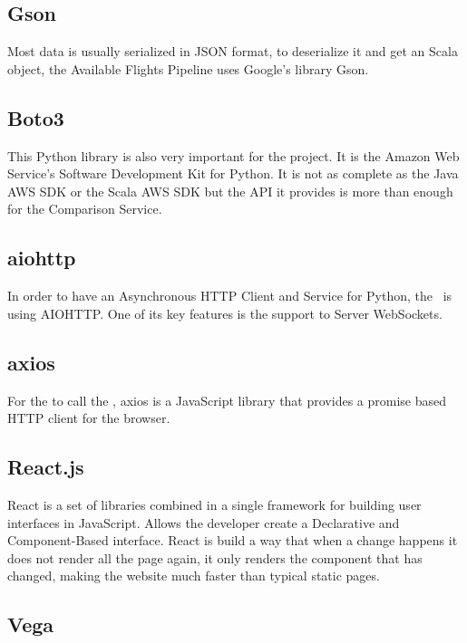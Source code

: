 \subsection*{Gson\cite{gson}} \label{gson}

Most data is usually serialized in JSON\cite{json} format, to deserialize it and get an Scala object, the Available Flights Pipeline uses Google's library Gson.

\subsection*{Boto3\cite{boto3}} \label{boto3}

This Python library is also very important for the project. It is the Amazon Web Service's Software Development Kit for Python. It is not as complete as the Java AWS SDK or the Scala AWS SDK but the  API it provides is more than enough for the Comparison Service.

\subsection*{aiohttp\cite{aiohttp}} \label{aiohttp}

In order to have an Asynchronous HTTP Client and Service for Python, the \thesis\ is using AIOHTTP. One of its key features is the support to Server WebSockets.

\subsection*{axios\cite{axios}} \label{axios}

For the  to call the , axios is a JavaScript library that provides a promise based HTTP client for the browser.

\subsection*{React.js\cite{reactjs}} \label{reactjs}

React is a set of libraries combined in a single framework for building user interfaces in JavaScript. Allows the developer create a Declarative and Component-Based interface. React is build a way that when a change happens it does not render all the page again, it only renders the component that has changed, making the website much faster than typical static pages.

\subsection*{Vega\cite{vega}} \label{vega}

